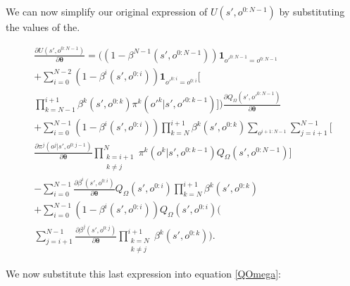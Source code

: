 \documentclass[letterpaper]{article} %
\begin{document}
We can now simplify our original expression of $U(s',o^{0:N-1})$ by substituting the values of the.

\begin{footnotesize}
\begin{equation} 
\begin{split}
\frac{\partial U(s',o^{0:N-1})}{\partial \bm{\theta}} = \bigg( (1-\beta^{N-1}(s',o^{0:N-1})) \textbf{1}_{o'^{0:N-1}=o^{0:N-1}} \\ 
+ \sum_{i=0}^{N - 2}(1-\beta^i(s',o^{0:i})) \textbf{1}_{o'^{0:i}=o^{0:i}} \bigg[ \\ \prod_{k=N-1}^{i+1} \beta^k(s',o^{0:k}) \pi^k(o'^k|s',o'^{0:k-1}) \bigg] \bigg) \frac{ \partial Q_\Omega(s',o'^{0:N-1})}{\partial \bm{\theta}}\\
+ \sum_{i=0}^{N - 1}(1-\beta^i(s',o^{0:i})) \prod_{k=N}^{i+1} \beta^k(s',o^{0:k}) \sum_{o^{i+1:N-1}}  \sum_{j=i+1}^{N-1} \bigg[\\ \frac{ \partial \pi^j(o^j|s',o^{0:j-1})}{\partial \bm{\theta}} \prod_{\substack{k=i+1 \\ k \neq j}}^{N} \pi^k(o^k|s',o^{0:k-1}) Q_\Omega(s',o^{0:N-1}) \bigg]\\
- \sum_{i=0}^{N - 1}\frac{ \partial \beta^i(s',o^{0:i})}{\partial \bm{\theta}} Q_\Omega(s',o^{0:i}) \prod_{k=N}^{i+1} \beta^k(s',o^{0:k}) \\
+ \sum_{i=0}^{N - 1}(1-\beta^i(s',o^{0:i})) Q_\Omega(s',o^{0:i}) \bigg(\\
\sum_{j=i+1}^{N-1} \frac{ \partial \beta^j(s',o^{0:j})}{\partial \bm{\theta}} \prod_{\substack{k=N \\ k \neq j}}^{i+1} \beta^k(s',o^{0:k}) \bigg).
\end{split}
\end{equation}
\end{footnotesize}

We now substitute this last expression into equation \ref{QOmega}:
\end{document}
